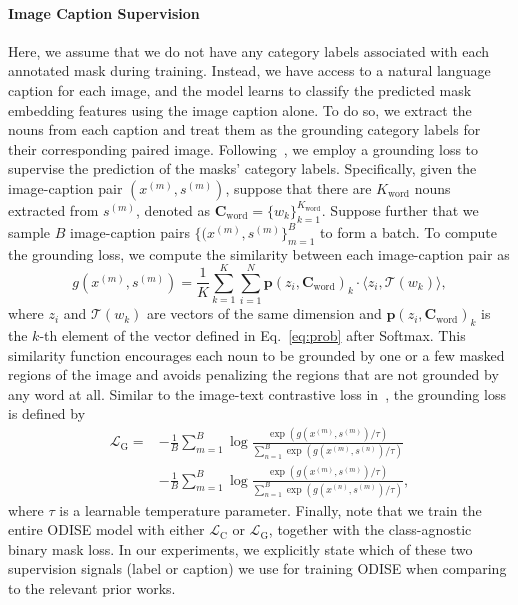 \documentclass[10pt,twocolumn,letterpaper]{article}
\newcommand{\ourmethod}{ODISE}
\begin{document}
\paragraph{Image Caption Supervision}
Here, we assume that we do not have any category labels associated with each annotated mask during training. 
Instead, we have access to a natural language caption for each image, and the model learns to classify the predicted mask embedding features using the image caption alone. 
To do so, we extract the nouns from each caption and treat them as the grounding category labels for their corresponding paired image. Following~\cite{gupta2020contrastive, zareian2021open, ghiasi2021open}, we employ a grounding loss to supervise the prediction of the masks' category labels. 
Specifically, given the image-caption pair $(x^{(m)}, s^{(m)})$, suppose that there are $K_\text{word}$ nouns extracted from $s^{(m)}$, denoted as $\mathbf{C}_\text{word} = \{w_k\}_{k=1}^{K_\text{word}}$. 
Suppose further that we sample $B$ image-caption pairs $\{(x^{(m)}, s^{(m)}\}_{m=1}^B$ to form a batch. To compute the grounding loss, we compute the similarity between each image-caption pair as 
\begin{equation}
     g(x^{(m)}, s^{(m)}) = \frac{1}{K}\sum_{k=1}^K\sum_{i=1}^N \mathbf{p}(z_i, \mathbf{C}_\text{word})_k{\cdot} \langle z_i, \mathcal{T}(w_k) \rangle,
\end{equation} 
where $z_i$ and $\mathcal{T}(w_k)$ are vectors of the same dimension and $\mathbf{p}(z_i, \mathbf{C}_\text{word})_k$ is the $k$-th element of the vector defined in Eq.~\ref{eq:prob} after Softmax.
This similarity function encourages each noun to be grounded by one or a few masked regions of the image and avoids penalizing the regions that are not grounded by any word at all.
Similar to the image-text contrastive loss in~\cite{radford2021clip, jia2021align}, the grounding loss is defined by
\begin{equation}
\begin{split}
    \mathcal{L}_{\text{G}} = &-\frac{1}{B}\sum_{m=1}^B\log \frac{\exp(g(x^{(m)}, s^{(m)}) /\tau) }{\sum_{n=1}^B \exp(g(x^{(m)}, s^{(n)}) /\tau)}\\
        &-\frac{1}{B}\sum_{m=1}^B\log \frac{\exp(g(x^{(m)}, s^{(m)}) /\tau) }{\sum_{n=1}^B \exp(g(x^{(n)}, s^{(m)}) /\tau)},
\end{split}
\end{equation}
where $\tau$ is a learnable temperature parameter.
Finally, note that we train the entire \ourmethod{} model with either $\mathcal{L}_\text{C}$ or $\mathcal{L}_{\text{G}}$, 
together with the class-agnostic binary mask loss. In our experiments, we explicitly state which of these two supervision signals (label or caption) we use for training \ourmethod{} when comparing to the relevant prior works.
\end{document}
